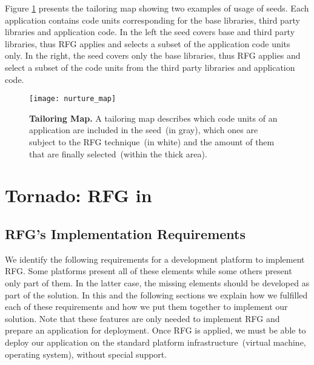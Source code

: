 Figure \ref{fig:nurturing_map_model} presents the tailoring map showing two examples of usage of seeds. Each application contains code units corresponding for the base libraries, third party libraries and application code. In the left the seed covers base and third party libraries, thus RFG applies and selects a subset of the application code units only. In the right, the seed covers only the base libraries, thus RFG applies and select a subset of the code units from the third party libraries and application code.

\begin{figure}[ht]
\begin{center}
\texttt{[image: nurture\_map]}
\caption{\small\textbf{Tailoring Map.} A tailoring map describes which code units of an application are included in the seed~(in gray), which ones are subject to the RFG technique~(in white) and the amount of them that are finally selected~(within the thick area).
\label{fig:nurturing_map_model}}
\end{center}
\end{figure}


\section{Tornado: RFG in \Vtt} \label{sec:implementation}

\subsection{RFG's Implementation Requirements}\label{sec:requirements}

We identify the following requirements for a development platform to implement RFG. Some platforms present all of these elements while some others present only part of them. In the latter case, the missing elements should be developed as part of the solution. In this and the following sections we explain how we fulfilled each of these requirements and how we put them together to implement our solution. Note that these features are only needed to implement RFG and prepare an application for deployment. Once RFG is applied, we must be able to deploy our application on the standard platform infrastructure~(virtual machine, operating system), without special support.

